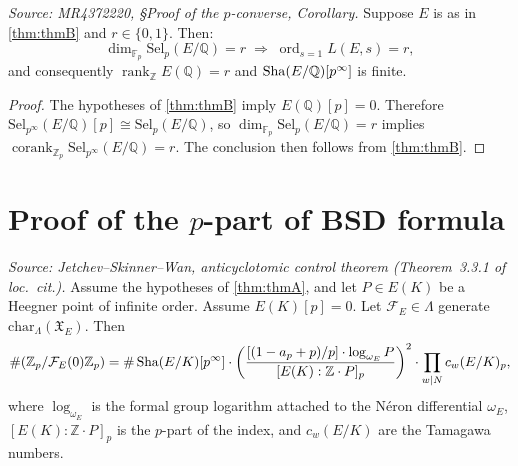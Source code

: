 \begin{corollary}
  \label{cor:thmB}
  \textit{Source: MR4372220, \S{}Proof of the $p$-converse, Corollary.}
  Suppose $E$ is as in \cref{thm:thmB} and $r \in \{0, 1\}$. Then:
  \[
    \dim_{\mathbb{F}_p} \mathrm{Sel}_p(E/\mathbb{Q}) = r
    \;\Longrightarrow\;
    \operatorname{ord}_{s=1} L(E, s) = r,
  \]
  and consequently $\operatorname{rank}_{\mathbb{Z}} E(\mathbb{Q}) = r$ and
  $\operatorname{Sha}(E/\mathbb{Q})[p^\infty]$ is finite.
\end{corollary}

\begin{proof}
  The hypotheses of \cref{thm:thmB} imply $E(\mathbb{Q})[p] = 0$.
  Therefore $\mathrm{Sel}_{p^\infty}(E/\mathbb{Q})[p] \cong \mathrm{Sel}_p(E/\mathbb{Q})$,
  so $\dim_{\mathbb{F}_p} \mathrm{Sel}_p(E/\mathbb{Q}) = r$ implies
  $\operatorname{corank}_{\mathbb{Z}_p} \mathrm{Sel}_{p^\infty}(E/\mathbb{Q}) = r$.
  The conclusion then follows from \cref{thm:thmB}.
\end{proof}

\section{Proof of the \texorpdfstring{$p$}{p}-part of BSD formula}

\begin{theorem}
  \label{thm:control-jsw}
  \textit{Source: Jetchev--Skinner--Wan, anticyclotomic control theorem (Theorem~3.3.1 of \emph{loc.~cit.}).}
  Assume the hypotheses of \cref{thm:thmA}, and let \(P \in E(K)\) be a Heegner point of infinite order. Assume \(E(K)[p] = 0\). Let \(\mathcal{F}_E \in \Lambda\) generate \(\mathrm{char}_\Lambda(\mathfrak{X}_E)\). Then
  \[
    \#(\mathbb{Z}_p / \mathcal{F}_E(0)\mathbb{Z}_p)
    = \#\operatorname{Sha}(E/K)[p^\infty]
      \cdot \left(\frac{[(1 - a_p + p)/p]\cdot\log_{\omega_E} P}{[E(K) : \mathbb{Z}\cdot P]_p}\right)^2
      \cdot \prod_{w \mid N} c_w(E/K)_p,
  \]
  where \(\log_{\omega_E}\) is the formal group logarithm attached to the Néron differential \(\omega_E\), \([E(K):\mathbb{Z}{\cdot}P]_p\) is the \(p\)-part of the index, and \(c_w(E/K)\) are the Tamagawa numbers.
\end{theorem}

